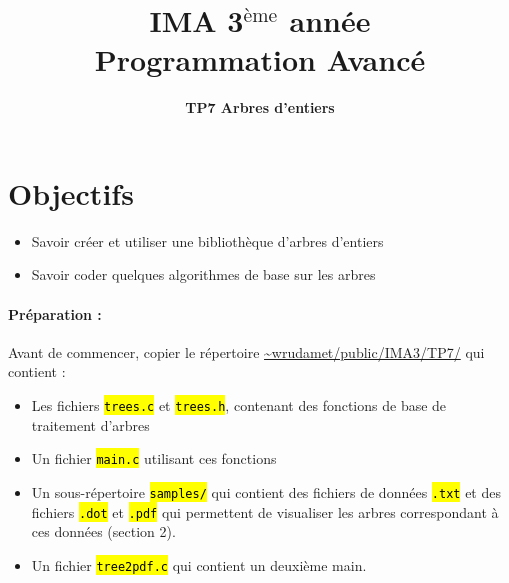 \documentclass[final, a4paper, openbib, ]{article}
\title{IMA 3$^{\mbox{\`eme}}$ année\\ Programmation Avancé
}
\author{\huge \textbf{TP7 Arbres d'entiers}}
\date{}
\let\OldTexttt\texttt
\renewcommand{\texttt}[1]{\OldTexttt{\hl{#1}}}
\begin{document}
\setlength{\droptitle}{-90pt}
\maketitle

\vspace{-2.1cm}
\section{Objectifs}

\begin{itemize}
	\item Savoir créer et utiliser une bibliothèque d'arbres d'entiers
	\item Savoir coder quelques algorithmes de base sur les arbres
\end{itemize}


\paragraph{Préparation : } Avant de commencer, copier le répertoire \url{~wrudamet/public/IMA3/TP7/} qui contient :

\begin{itemize}
	\item Les fichiers \texttt{trees.c} et \texttt{trees.h}, contenant des fonctions de base de traitement d'arbres
	\item Un fichier \texttt{main.c} utilisant ces fonctions
	\item Un sous-répertoire \texttt{samples/} qui contient des fichiers de données \texttt{.txt} et des fichiers \texttt{.dot} et \texttt{.pdf} qui permettent de visualiser les arbres correspondant à ces données (section 2).
	\item Un fichier \texttt{tree2pdf.c} qui contient un deuxième main.
\end{itemize}
\end{document}

